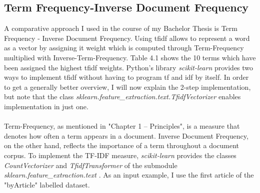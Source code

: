 \documentclass[a4paper, 11pt,titlepage,oneside,openany]{book}
\begin{document}
\subsection{Term Frequency-Inverse Document Frequency}
A comparative approach I used in the course of my Bachelor Thesis is Term Frequency - Inverse Document Frequency. Using \gls{tfidf} allows to represent a word as a vector by assigning it weight which is computed through Term-Frequency multiplied with Inverse-Term-Frequency. Table 4.1 shows the 10 terms which have been assigned the highest \gls{tfidf} weights. Python's library \textit{scikit-learn} \cite{scikit-learn} provides two ways to implement \gls{tfidf} without having to program \gls{tf} and \gls{idf} by itself.
In order to get a generally better overview, I will now explain the 2-step implementation, but note that the class \textit{sklearn.feature\_extraction.text.TfidfVectorizer} enables implementation in just one. \\
\\ Term-Frequency, as mentioned in "Chapter 1 -- Principles", is a measure that denotes how often a term appears in a document. Inverse Document Frequency, on the other hand, reflects the importance of a term throughout a document corpus. To implement the TF-IDF measure, \textit{scikit-learn} provides the classes \textit{CountVectorizer} and \textit{TfidfTransformer} of the submodule \textit{sklearn.feature\_extraction.text} \cite{tfidf}. As an input example, I use the first article of the "byArticle" labelled dataset. \\
\end{document}

